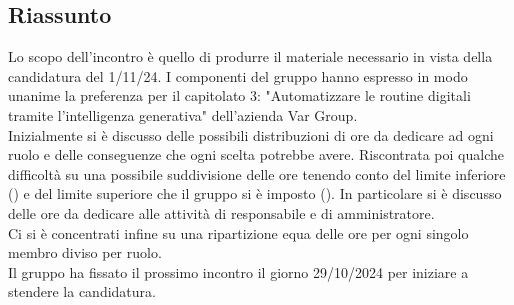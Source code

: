 \documentclass[10pt]{article}
\begin{document}
\subsection{Riassunto}
Lo scopo dell'incontro è quello di produrre il materiale necessario in vista della candidatura del 1/11/24. I componenti del gruppo hanno espresso in modo unanime la preferenza per il capitolato 3: "Automatizzare le routine digitali tramite l'intelligenza generativa" dell'azienda Var Group.\\
Inizialmente si è discusso delle possibili distribuzioni di ore da dedicare ad ogni ruolo e delle conseguenze che ogni scelta potrebbe avere. Riscontrata poi qualche difficoltà su una possibile suddivisione delle ore tenendo conto del limite inferiore () e del limite superiore che il gruppo si è imposto ().
In particolare si è discusso delle ore da dedicare alle attività di responsabile e di amministratore. \\
Ci si è concentrati infine su una ripartizione equa delle ore per ogni singolo membro diviso per ruolo.\\
Il gruppo ha fissato il prossimo incontro il giorno 29/10/2024 per iniziare a stendere la candidatura.
\end{document}
